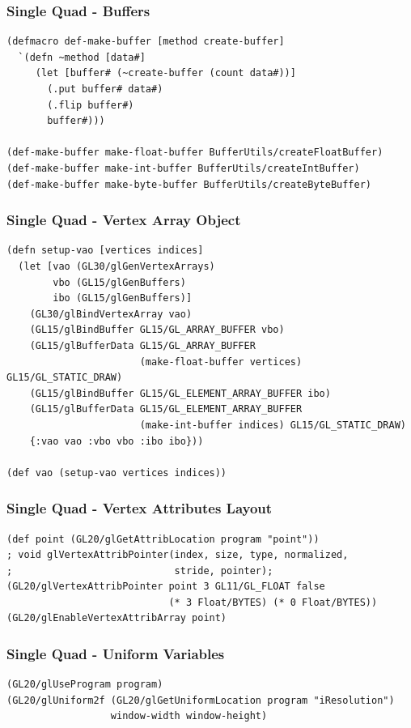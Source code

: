 \documentclass[aspectratio=169,11pt,xcolor=dvipsnames]{beamer}
\begin{document}
\begin{frame}[fragile]
  \frametitle{Single Quad {-} Buffers}
  \begin{verbatim}
(defmacro def-make-buffer [method create-buffer]
  `(defn ~method [data#]
     (let [buffer# (~create-buffer (count data#))]
       (.put buffer# data#)
       (.flip buffer#)
       buffer#)))

(def-make-buffer make-float-buffer BufferUtils/createFloatBuffer)
(def-make-buffer make-int-buffer BufferUtils/createIntBuffer)
(def-make-buffer make-byte-buffer BufferUtils/createByteBuffer)
  \end{verbatim}
\end{frame}

\begin{frame}[fragile]
  \frametitle{Single Quad {-} Vertex Array Object}
  \begin{verbatim}
(defn setup-vao [vertices indices]
  (let [vao (GL30/glGenVertexArrays)
        vbo (GL15/glGenBuffers)
        ibo (GL15/glGenBuffers)]
    (GL30/glBindVertexArray vao)
    (GL15/glBindBuffer GL15/GL_ARRAY_BUFFER vbo)
    (GL15/glBufferData GL15/GL_ARRAY_BUFFER
                       (make-float-buffer vertices) GL15/GL_STATIC_DRAW)
    (GL15/glBindBuffer GL15/GL_ELEMENT_ARRAY_BUFFER ibo)
    (GL15/glBufferData GL15/GL_ELEMENT_ARRAY_BUFFER
                       (make-int-buffer indices) GL15/GL_STATIC_DRAW)
    {:vao vao :vbo vbo :ibo ibo}))

(def vao (setup-vao vertices indices))
  \end{verbatim}
\end{frame}

\begin{frame}[fragile]
  \frametitle{Single Quad {-} Vertex Attributes Layout}
  \begin{verbatim}
(def point (GL20/glGetAttribLocation program "point"))
; void glVertexAttribPointer(index, size, type, normalized,
;                            stride, pointer);
(GL20/glVertexAttribPointer point 3 GL11/GL_FLOAT false
                            (* 3 Float/BYTES) (* 0 Float/BYTES))
(GL20/glEnableVertexAttribArray point)
  \end{verbatim}
\end{frame}

\begin{frame}[fragile]
  \frametitle{Single Quad {-} Uniform Variables}
  \begin{verbatim}
(GL20/glUseProgram program)
(GL20/glUniform2f (GL20/glGetUniformLocation program "iResolution")
                  window-width window-height)
  \end{verbatim}
\end{frame}
\end{document}
